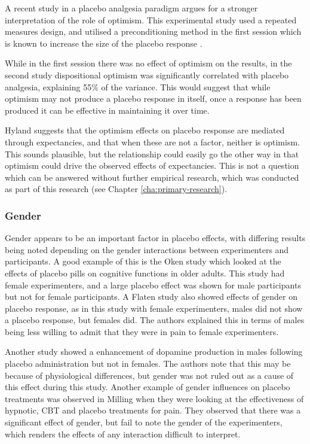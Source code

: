A recent study \cite{morton2009reproducibility} in a placebo analgesia paradigm argues for a stronger interpretation of the role of optimism. This experimental study used a repeated measures design, and utilised a preconditioning method in the first session which is known to increase the size of the placebo response \cite{Voudouris1985}. 

While in the first session there was no effect of optimism on the results, in the second study dispositional optimism was significantly correlated with placebo analgesia, explaining 55\% of the variance. This would suggest that while optimism may not produce a placebo response in itself, once a response has been produced it can be effective in maintaining it over time. 

Hyland suggests that the optimism effects on placebo response are mediated through expectancies, and that when these are not a factor, neither is optimism. This sounds plausible, but the relationship could easily go the other way in that optimism could drive the observed effects of expectancies. This is not a question which can be answered without further empirical research, which was conducted as part of this research (see Chapter \ref{cha:primary-research}). 

\subsubsection{Gender}
\label{sec:gender}

Gender appears to be an important factor in placebo effects, with differing results being noted depending on the gender interactions between experimenters and participants. A good example of this is the Oken \cite{Oken2008} study which looked at the  effects of placebo pills on cognitive functions in older adults. This study had female experimenters, and a large placebo effect was shown for male participants but not for female participants. A Flaten \cite{Flaten2006} study also showed effects of gender on placebo response, as in this study with female experimenters, males did not show a placebo response, but females did. The authors explained this in terms of males being less willing to admit that they were in pain to female experimenters.

 Another study \cite{Zubieta2006} showed a enhancement of dopamine production in males following placebo administration but not in females. The authors note that this may be because of physiological differences, but gender was not ruled out as a cause of this effect during this study. Another example of gender influences on placebo treatments was observed in Milling \cite{Milling2007}  when they were looking at the effectiveness of hypnotic, CBT and placebo treatments for pain. They observed that there was a significant effect of gender, but fail to note the gender of the experimenters, which renders the effects of any interaction difficult to interpret. 


